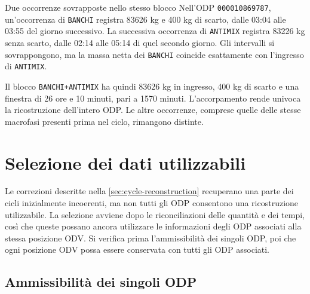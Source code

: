 \begingroup
{}
\begin{examplebox}{Due occorrenze sovrapposte nello stesso blocco}
Nell'ODP \texttt{000010869787}, un'occorrenza di \texttt{BANCHI} registra \num{83626} kg e 400 kg di scarto, dalle 03:04 alle 03:55 del giorno successivo. La successiva occorrenza di \texttt{ANTIMIX} registra \num{83226} kg senza scarto, dalle 02:14 alle 05:14 di quel secondo giorno. Gli intervalli si sovrappongono, ma la massa netta dei \texttt{BANCHI} coincide esattamente con l'ingresso di \texttt{ANTIMIX}.

\begin{center}

\end{center}

Il blocco \texttt{BANCHI+ANTIMIX} ha quindi \num{83626} kg in ingresso, 400 kg di scarto e una finestra di 26 ore e 10 minuti, pari a \num{1570} minuti. L'accorpamento rende univoca la ricostruzione dell'intero ODP. Le altre occorrenze, comprese quelle delle stesse macrofasi presenti prima nel ciclo, rimangono distinte.
\end{examplebox}
\endgroup

\section{Selezione dei dati utilizzabili}
\label{sec:usable-data-selection}

Le correzioni descritte nella \cref{sec:cycle-reconstruction} recuperano una parte dei cicli inizialmente incoerenti, ma non tutti gli ODP consentono una ricostruzione utilizzabile. La selezione avviene dopo le riconciliazioni delle quantità e dei tempi, così che queste possano ancora utilizzare le informazioni degli ODP associati alla stessa posizione ODV. Si verifica prima l'ammissibilità dei singoli ODP, poi che ogni posizione ODV possa essere conservata con tutti gli ODP associati.

\subsection{Ammissibilità dei singoli ODP}
\label{sec:individual-order-selection}

